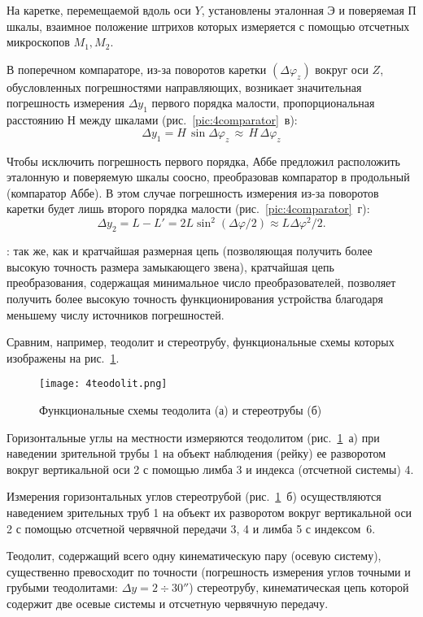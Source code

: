 На каретке, перемещаемой вдоль оси $ Y $, установлены эталонная Э и поверяемая П шкалы, взаимное положение штрихов которых измеряется с помощью отсчетных микроскопов $ M_1, M_2 $.

В поперечном компараторе, из-за поворотов каретки $ (\Delta \varphi_z) $ вокруг оси $ Z $, обусловленных погрешностями направляющих, возникает значительная погрешность измерения $ \Delta y_1 $ первого порядка малости, пропорциональная расстоянию $ Н $ между шкалами (рис.~\ref{pic:4comparator}~в):
\[ 
\Delta y_1 = H\,\sin\Delta\varphi_z\,\approx\, H\,\Delta\varphi_z
\]

Чтобы исключить погрешность первого порядка, Аббе предложил расположить эталонную и поверяемую шкалы соосно, преобразовав компаратор в продольный (компаратор Аббе). В этом случае погрешность измерения из-за поворотов каретки будет лишь второго порядка малости (рис.~\ref{pic:4comparator}~г):
\[ 
\Delta y_2 = L - L' = 2L\sin^2(\Delta\varphi/2) \approx L \Delta\varphi^2 /2.
\]

: так же, как и кратчайшая размерная цепь (позволяющая получить более высокую точность размера замыкающего звена), кратчайшая цепь преобразования, содержащая минимальное число преобразователей, позволяет получить более высокую точность функционирования устройства благодаря меньшему числу источников погрешностей.

Сравним, например, теодолит и стереотрубу, функциональные схемы которых изображены на рис.~\ref{pic:4teodolit}.

\begin{figure}[h!]
	\caption[Функциональные схемы теодолита и стереотрубы]{Функциональные схемы теодолита (а) и стереотрубы (б)}
	\texttt{[image: 4teodolit.png]}
	\label{pic:4teodolit}
\end{figure}

Горизонтальные углы на местности измеряются теодолитом (рис.~\ref{pic:4teodolit}~а) при наведении зрительной трубы 1 на объект наблюдения (рейку) ее разворотом вокруг вертикальной оси 2 с помощью лимба 3 и индекса (отсчетной системы) 4. 

Измерения горизонтальных углов стереотрубой (рис.~\ref{pic:4teodolit}~б) осуществляются наведением зрительных труб 1 на объект их разворотом вокруг вертикальной оси 2 с помощью отсчетной червячной передачи 3, 4 и лимба 5 с индексом~6.

Теодолит, содержащий всего одну кинематическую пару (осевую систему), существенно превосходит по точности (погрешность измерения углов точными и грубыми теодолитами:  $ \Delta y=2\div30'' $) стереотрубу, кинематическая цепь которой содержит две осевые системы и отсчетную червячную передачу. 

